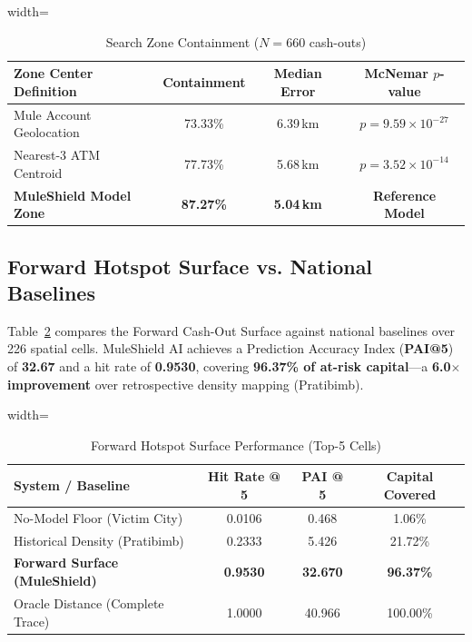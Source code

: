 \documentclass[conference]{IEEEtran}
\begin{document}
\begin{table}[htbp]
\caption{Search Zone Containment ($N=660$ cash-outs)}
\label{tab:zone}
\centering
\begin{adjustbox}{width=\columnwidth}
\begin{tabular}{lccc}
\toprule
\textbf{Zone Center Definition} & \textbf{Containment} & \textbf{Median Error} & \textbf{McNemar $p$-value} \\
\midrule
Mule Account Geolocation & 73.33\% & 6.39\,km & $p = 9.59 \times 10^{-27}$ \\
Nearest-3 ATM Centroid & 77.73\% & 5.68\,km & $p = 3.52 \times 10^{-14}$ \\
\textbf{MuleShield Model Zone} & \textbf{87.27\%} & \textbf{5.04\,km} & \textbf{Reference Model} \\
\bottomrule
\end{tabular}
\end{adjustbox}
\end{table}

\subsection{Forward Hotspot Surface vs. National Baselines}
Table~\ref{tab:hotspot} compares the Forward Cash-Out Surface against national baselines over 226 spatial cells. MuleShield AI achieves a Prediction Accuracy Index (\textbf{PAI@5}) \cite{chainey2008, adepeju2016} of \textbf{32.67} and a hit rate of \textbf{0.9530}, covering \textbf{96.37\% of at-risk capital}---a \textbf{6.0$\times$ improvement} over retrospective density mapping (Pratibimb).

\begin{table}[htbp]
\caption{Forward Hotspot Surface Performance (Top-5 Cells)}
\label{tab:hotspot}
\centering
\begin{adjustbox}{width=\columnwidth}
\begin{tabular}{lccc}
\toprule
\textbf{System / Baseline} & \textbf{Hit Rate @ 5} & \textbf{PAI @ 5} & \textbf{Capital Covered} \\
\midrule
No-Model Floor (Victim City) & 0.0106 & 0.468 & 1.06\% \\
Historical Density (Pratibimb) & 0.2333 & 5.426 & 21.72\% \\
\textbf{Forward Surface (MuleShield)} & \textbf{0.9530} & \textbf{32.670} & \textbf{96.37\%} \\
Oracle Distance (Complete Trace) & 1.0000 & 40.966 & 100.00\% \\
\bottomrule
\end{tabular}
\end{adjustbox}
\end{table}
\end{document}
